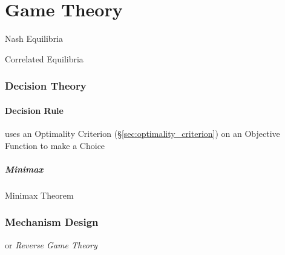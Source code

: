 \part{Game Theory}\label{sec:game_theory}

Nash Equilibria

Correlated Equilibria



\section{Decision Theory}\label{sec:decision_theory}

\subsection{Decision Rule}\label{sec:decision_rule}

uses an Optimality Criterion (\S\ref{sec:optimality_criterion}) on an Objective
Function to make a Choice



\subsubsection{Minimax}\label{sec:minimax}

Minimax Theorem



\section{Mechanism Design}\label{sec:mechanism_design}

or \emph{Reverse Game Theory}
